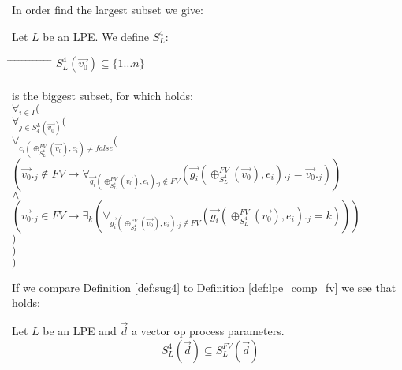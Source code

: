 \index{}\documentclass[a4paper,10pt]{article}
\theoremstyle{plain}
\theoremstyle{definition}
\newcommand{\ovr}{\overrightarrow}
\newcommand{\pps}{process parameters}
\newcommand{\tb}{\textbf}
\newcommand{\tab}{\hspace*{5.mm} \= \hspace*{5.mm} \= \hspace*{5.mm} \= \hspace*{5.mm} \= \hspace*{5.mm} \= \hspace*{5.mm}  \= \hspace*{5.mm}  \= \hspace*{5.mm}  \= \hspace*{5.mm} \= \hspace*{5.mm} \= \hspace*{5.mm}  \= \hspace*{5.mm}  \= \hspace*{5.mm}\kill}
\begin{document}
\newcommand{\z}{(\oplus_{S_L^4}^{FV}(\ovr{v_0}),e_i)}

\noindent In order find the largest subset we give: %
\begin{defn} \label{def:sug4} Let $L$ be an LPE. We define $S_L^4$:
\begin{tabbing}
\tab
$ S_L^4(\ovr{v_0}) \subseteq \lbrace 1 \ldots n  \rbrace $ \\ \\
is the biggest subset, for which holds:\\
\> $\forall_{i \in I }($ \\ 
\> \> $\forall_{j \in S^L_4(\ovr{v_0})}($\\
\> \> \> $ \forall_{c_i\z \neq false}( $ \\
\> \> \> \> $(\ovr{v_0}._j \not\in FV \rightarrow \forall_{\ovr{g_i}\z._j \not\in FV}( \ovr{g_i}\z._j = \ovr{v_0}._j ))$\\
\> \> \> $\wedge$\\
\> \> \> \> $(\ovr{v_0}._j \in FV \rightarrow \exists_k(\forall_{\ovr{g_i}\z._j \not\in FV }(\ovr{g_i}\z._j = k))) $\\
\> \> \> $)$ \\
\> \>$)$\\
\> $)$ \\
\end{tabbing}
\end{defn}

If we compare Definition \ref{def:sug4} to Definition \ref{def:lpe_comp_fv} we see that holds:
\begin{thm} Let $L$ be an LPE and $\ovr{d}$ a vector op \pps . \label{thm:sub_fv}
$$S_L^4(\ovr{d}) \subseteq S_L^{FV}(\ovr{d}) $$
\end{thm} 

\end{document}
